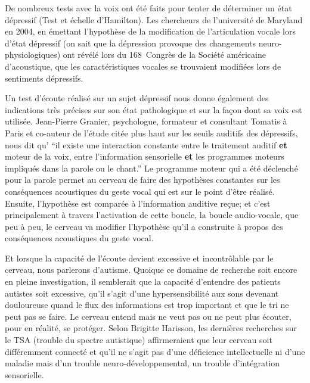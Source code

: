 De nombreux tests avec 
la voix
 ont été faits pour tenter de déterminer un état dépressif 
(Test et échelle d'Hamilton). Les chercheurs de l'université de Maryland en 
2004,
en émettant l'hypothèse de la modification de l'articulation vocale 
lors d'état dépressif (on sait que la dépression provoque des changements  
neuro-physiologiques) ont révélé lors du 168\ieme\ Congrès de la Société
américaine d'acoustique, que les caractéristiques 
vocales se trouvaient modifiées lors de sentiments 
dépressifs\autocite{le_service_metronews}.



Un test d'écoute réalisé sur un sujet dépressif nous donne également des indications
très précises sur son état
pathologique et sur la façon dont sa voix est utilisée. Jean-Pierre
Granier, psychologue, formateur et consultant Tomatis à Paris et
co-auteur de l'étude citée plus haut sur les seuils auditifs des dépressifs, nous dit qu' 
``il existe une 
interaction
constante entre le traitement auditif \textbf{et} moteur de la
voix, entre l'information sensorielle \textbf{et} les programmes moteurs impliqués
dans la parole ou le chant.'' Le programme moteur qui a été déclenché
pour la parole permet au cerveau de faire des hypothèses constantes
sur les conséquences acoustiques du geste vocal qui est sur le point
d'être réalisé. Ensuite, l'hypothèse est comparée à l'information
auditive reçue; et c'est principalement à travers l'activation de cette boucle, la
boucle audio-vocale, que peu à peu, le cerveau va modifier l'hypothèse
qu'il a construite à propos des conséquences acoustiques du geste vocal.





Et lorsque la capacité de l'écoute devient excessive et incontrôlable par le cerveau, nous 
parlerons d'autisme. Quoique
  ce domaine de recherche  soit encore en pleine investigation, il semblerait que la capacité 
  d'entendre des patients autistes soit excessive, qu'il s'agit d'une hypersensibilité aux sons 
  devenant douloureuse quand  le flux des informations est trop important et que le tri ne 
  peut pas se faire. Le cerveau entend mais ne veut pas ou ne peut plus  écouter, pour en 
  réalité, se protéger.
Selon Brigitte Harisson,  
 les dernières recherches sur le TSA (trouble du spectre autistique) affirmeraient que leur
  cerveau soit différemment connecté et qu'il ne s'agit pas d'une déficience intellectuelle ni
   d'une maladie mais d'un trouble neuro-développemental, un trouble
  d'intégration sensorielle.\autocite[Cet ouvrage propose une description unique du TSA
   (trouble du spectre de l'autisme pp. 22--23)]{harrisson.st-charles:lautisme}

